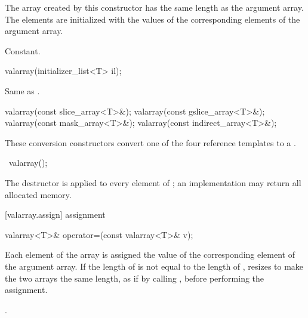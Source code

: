 \begin{itemdescr}
\pnum
The array created by this constructor has the same length as the argument
array.
The elements are initialized with the values of the corresponding
elements of the argument array.

\pnum
\complexity Constant.
\end{itemdescr}

%
\begin{itemdecl}
valarray(initializer_list<T> il);
\end{itemdecl}

\begin{itemdescr}
\pnum
\effects Same as .
\end{itemdescr}

%
\begin{itemdecl}
valarray(const slice_array<T>&);
valarray(const gslice_array<T>&);
valarray(const mask_array<T>&);
valarray(const indirect_array<T>&);
\end{itemdecl}

\begin{itemdescr}
\pnum
These conversion constructors convert one of the four reference templates
to a
.
\end{itemdescr}

%
\begin{itemdecl}
~valarray();
\end{itemdecl}

\begin{itemdescr}
\pnum
The destructor is applied to every element of
;
an implementation may return all allocated memory.
\end{itemdescr}

[valarray.assign]{ assignment}

%
\begin{itemdecl}
valarray<T>& operator=(const valarray<T>& v);
\end{itemdecl}

\begin{itemdescr}
\pnum
Each element of the
array is assigned the value of the corresponding element of the argument
array.
If the length of  is not equal to the length of 
, resizes  to make the two arrays the same length,
as if by calling , before performing the assignment.

\pnum
\postcondition {}.
\end{itemdescr}

